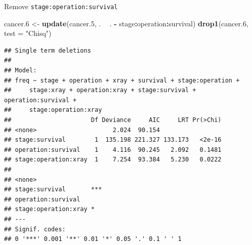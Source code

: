 \documentclass[ignorenonframetext,]{beamer}
\newenvironment{Shaded}{\begin{snugshade}}{\end{snugshade}}
\newcommand{\DataTypeTok}[1]{\textcolor[rgb]{0.13,0.29,0.53}{#1}}
\newcommand{\FloatTok}[1]{\textcolor[rgb]{0.00,0.00,0.81}{#1}}
\newcommand{\KeywordTok}[1]{\textcolor[rgb]{0.13,0.29,0.53}{\textbf{#1}}}
\newcommand{\NormalTok}[1]{#1}
\newcommand{\OperatorTok}[1]{\textcolor[rgb]{0.81,0.36,0.00}{\textbf{#1}}}
\newcommand{\StringTok}[1]{\textcolor[rgb]{0.31,0.60,0.02}{#1}}
\begin{document}
\begin{frame}[fragile]{Remove \texttt{stage:operation:survival}}
\protect\hypertarget{remove-stageoperationsurvival}{}

\begin{Shaded}
\begin{Highlighting}[]
\NormalTok{cancer}\FloatTok{.6}\NormalTok{ <-}\StringTok{ }\KeywordTok{update}\NormalTok{(cancer}\FloatTok{.5}\NormalTok{, . }\OperatorTok{~}\StringTok{ }\NormalTok{. }\OperatorTok{-}\StringTok{ }\NormalTok{stage}\OperatorTok{:}\NormalTok{operation}\OperatorTok{:}\NormalTok{survival)}
\KeywordTok{drop1}\NormalTok{(cancer}\FloatTok{.6}\NormalTok{, }\DataTypeTok{test =} \StringTok{"Chisq"}\NormalTok{)}
\end{Highlighting}
\end{Shaded}

\begin{verbatim}
## Single term deletions
## 
## Model:
## freq ~ stage + operation + xray + survival + stage:operation + 
##     stage:xray + operation:xray + stage:survival + operation:survival + 
##     stage:operation:xray
##                      Df Deviance     AIC     LRT Pr(>Chi)
## <none>                     2.024  90.154                 
## stage:survival        1  135.198 221.327 133.173   <2e-16
## operation:survival    1    4.116  90.245   2.092   0.1481
## stage:operation:xray  1    7.254  93.384   5.230   0.0222
##                         
## <none>                  
## stage:survival       ***
## operation:survival      
## stage:operation:xray *  
## ---
## Signif. codes:  
## 0 '***' 0.001 '**' 0.01 '*' 0.05 '.' 0.1 ' ' 1
\end{verbatim}

\end{frame}
\end{document}
